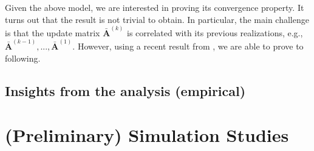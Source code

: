 \documentclass[letter]{article}
\newtheorem{prop}{Proposition}
\theoremstyle{remark}
\begin{document}
Given the above model, we are interested in proving its convergence property. It turns out that the result is not trivial to obtain. In particular, the main challenge is that the update matrix $\bar{\bm A}^{(k)}$ is correlated with its previous realizations, e.g., $\bar{\bm A}^{(k-1)}, ..., \bar{\bm A}^{(1)}$. However, using a recent result from \cite{}, we are able to prove to following. 


\subsection{Insights from the analysis (empirical)}

\section{(Preliminary) Simulation Studies}


%
%




\end{document}
